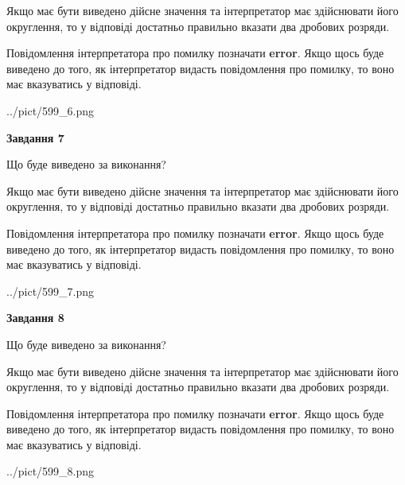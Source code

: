 \documentclass[12pt, ukrainian]{article}
\begin{document}
{\begin {Large}
Якщо має бути виведено дійсне значення та інтерпретатор має здійснювати його округлення, 
то у відповіді достатньо правильно вказати два дробових розряди.

Повідомлення інтерпретатора про помилку позначати \textbf{error}.
Якщо щось буде виведено до того, як інтерпретатор видасть повідомлення про помилку, 
то воно має вказуватись у відповіді. \par

\begin{center}
	{../pict/599_6.png}
\end{center}
\newpage

{\begin {center}\textbf{Завдання 7}\end {center}}\par
Що буде виведено за виконання? \par

Якщо має бути виведено дійсне значення та інтерпретатор має здійснювати його округлення, 
то у відповіді достатньо правильно вказати два дробових розряди.

Повідомлення інтерпретатора про помилку позначати \textbf{error}.
Якщо щось буде виведено до того, як інтерпретатор видасть повідомлення про помилку, 
то воно має вказуватись у відповіді. \par

\begin{center}
	{../pict/599_7.png}
\end{center}
\newpage

{\begin {center}\textbf{Завдання 8}\end {center}}\par
Що буде виведено за виконання? \par

Якщо має бути виведено дійсне значення та інтерпретатор має здійснювати його округлення, 
то у відповіді достатньо правильно вказати два дробових розряди.

Повідомлення інтерпретатора про помилку позначати \textbf{error}.
Якщо щось буде виведено до того, як інтерпретатор видасть повідомлення про помилку, 
то воно має вказуватись у відповіді. \par

\begin{center}
	{../pict/599_8.png}
\end{center}
\newpage


\end{Large}}
\end{document}

